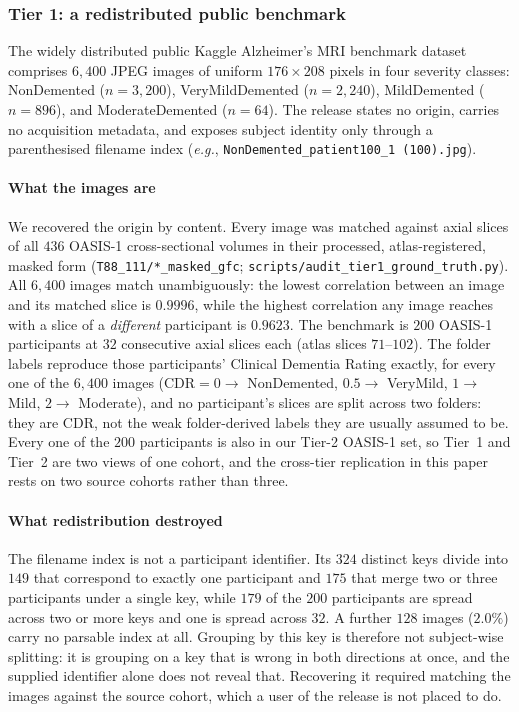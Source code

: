 \documentclass[11pt]{article}
\newcommand{\eg}{\textit{e.g.},}
\providecommand{\pb}{\discretionary{}{}{}}
\begin{document}
\subsubsection{Tier 1: a redistributed public benchmark}
\label{sm:sec:data_kaggle}
The widely distributed public Kaggle Alzheimer's MRI benchmark
dataset~\cite{kaggle_ad_4class} comprises $6{,}400$ JPEG images of
uniform $176 \times 208$ pixels in four severity classes:
NonDemented ($n = 3{,}200$), VeryMildDemented ($n = 2{,}240$),
MildDemented ($n = 896$), and ModerateDemented ($n = 64$). The
release states no origin, carries no acquisition metadata, and
exposes subject identity only through a parenthesised filename index
(\eg{} \texttt{NonDemented\_\pb patient100\_\pb 1 (100).jpg}).

\paragraph{What the images are}
We recovered the origin by content. Every image was matched against
axial slices of all $436$ OASIS-1 cross-sectional volumes in their
processed, atlas-registered, masked form
(\texttt{T88\_111/*\_masked\_gfc};
\texttt{scripts/\pb audit\_tier1\_ground\_truth.py}). All $6{,}400$
images match unambiguously: the lowest correlation between an image
and its matched slice is $0.9996$, while the highest correlation any
image reaches with a slice of a \emph{different} participant is
$0.9623$. The benchmark is $200$ OASIS-1 participants at $32$
consecutive axial slices each (atlas slices $71$--$102$). The folder labels
reproduce those participants' Clinical Dementia Rating exactly, for
every one of the $6{,}400$ images ($\text{CDR} = 0 \rightarrow$
NonDemented, $0.5 \rightarrow$ VeryMild, $1 \rightarrow$ Mild,
$2 \rightarrow$ Moderate), and no participant's slices are split
across two folders: they are CDR, not the weak folder-derived labels
they are usually assumed to be. Every one of the $200$
participants is also in our Tier-2 OASIS-1 set, so Tier~1 and Tier~2
are two views of one cohort, and the cross-tier replication in this
paper rests on two source cohorts rather than three.

\paragraph{What redistribution destroyed}
The filename index is not a participant identifier. Its $324$
distinct keys divide into $149$ that correspond to exactly one
participant and $175$ that merge two or three participants under a
single key, while $179$ of the $200$ participants are spread across
two or more keys and one is spread across $32$. A further $128$
images ($2.0\%$) carry no parsable index at all. Grouping by this key
is therefore not subject-wise splitting: it is grouping on a key that
is wrong in both directions at once, and the supplied identifier alone
does not reveal that. Recovering it required matching the images against
the source cohort, which a user of the release is not placed to do.
\end{document}

